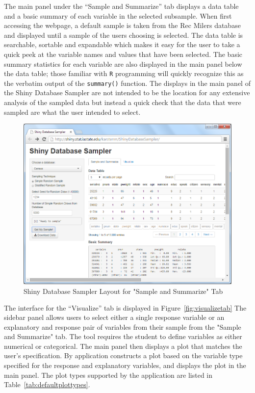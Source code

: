 \documentclass{article}\usepackage[]{graphicx}\usepackage[]{color}
\newcommand{\km}[1]{{\color{Orange} #1}}
\begin{document}
\km{  The main panel under the ``Sample and Summarize'' tab displays a data table and a basic summary of each variable in the selected subsample.  When first accessing the webpage, a default sample is taken from the Rec Milers database and displayed until a sample of the users choosing is selected.  The data table is searchable, sortable and expandable which makes it easy for the user to take a quick peek at the variable names and values that have been selected.  The basic summary statistics for each variable are also displayed in the main panel below the data table; those familiar with \texttt{R} programming will quickly recognize this as the verbatim output of the \texttt{summary()} function.  The displays in the main panel of the Shiny Database Sampler are not intended to be the location for any extensive analysis of the sampled data but instead a quick check that the data that were sampled are what the user intended to select.  \\ }

\begin{figure}[htbp]
\begin{center}
\includegraphics[keepaspectratio=TRUE,width=.99\textwidth]{figure/SampleAndSummarize.png}
\end{center}
\caption{Shiny Database Sampler Layout for "Sample and Summarize" Tab} 
\label{fig:samplesummarizetab}
\end{figure}

\km{  The interface for the ``Visualize'' tab is displayed in Figure~\ref{fig:visualizetab} The sidebar panel allows users to select either a single response variable or an explanatory and response pair of variables from their sample from the "Sample and Summarize" tab. The tool requires the student to define variables as either numerical or categorical.  The main panel then displays a plot that matches the user's specification.  By application constructs a plot based on the variable type specified for the response and explanatory variables, and displays the plot in the main panel. The plot types supported by the application are listed in Table~\ref{tab:defaultplottypes}. \\   }
\end{document}
